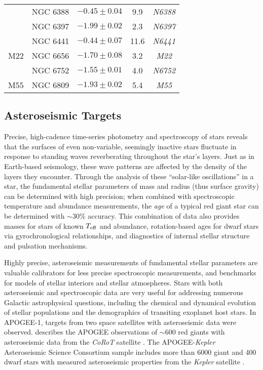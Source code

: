\documentclass[12pt,twocolumn]{emulateapj}
\begin{document}
\begin{table*}[hpbt]
\begin{center}
\begin{tabular}{l l c c c}
 & NGC 6388 & $-0.45 \pm 0.04$ & 9.9 & {\it N6388} \\
 & NGC 6397 & $-1.99 \pm 0.02$ & 2.3 & {\it N6397} \\
 & NGC 6441 & $-0.44 \pm 0.07$ & 11.6 & {\it N6441} \\
M22 & NGC 6656 & $-1.70 \pm 0.08$ & 3.2 & {\it M22} \\
 & NGC 6752 & $-1.55 \pm 0.01$ & 4.0 & {\it N6752} \\
M55 & NGC 6809 & $-1.93 \pm 0.02$ & 5.4 & {\it M55} \\
  \end{tabular}
  \label{tab:clusters}
  \end{center}
\end{table*}


\subsection{Asteroseismic Targets}
\label{sec:asteroseismic}

Precise, high-cadence time-series photometry and spectroscopy of stars reveals that the surfaces of even non-variable, seemingly inactive stars fluctuate in response to standing waves reverberating throughout the star's layers.  Just as in Earth-based seismology, these wave patterns are affected by the density of the layers they encounter.  Through the analysis of these ``solar-like oscillations'' in a star, the fundamental stellar parameters of mass and radius (thus surface gravity) can be determined with high precision; when combined with spectroscopic temperature and abundance measurements, the {\it age} of a typical red giant star can be determined with $\sim$30\% accuracy.  This combination of data also provides masses for stars of known $T_{\rm eff}$ and abundance, rotation-based ages for dwarf stars via gyrochronological relationships, and diagnostics of internal stellar structure and pulsation mechanisms.

Highly precise, asteroseismic measurements of fundamental stellar parameters are valuable calibrators for less precise spectroscopic measurements, and benchmarks for models of stellar interiors and stellar atmospheres.  Stars with both asteroseismic and spectroscopic data are very useful for addressing numerous Galactic astrophysical questions, including the chemical and dynamical evolution of stellar populations and the demographics of transiting exoplanet host stars. In APOGEE-1, targets from two space satellites with asteroseismic data were observed. \citet{Anders_2017_corotgee} describes the APOGEE observations of $\sim$600 red giants with asteroseismic data from the {\it CoRoT} satellite \citep{Baglin_2006_corot}.  The APOGEE-{\it Kepler} Asteroseismic Science Consortium sample \citep[APOKASC sample;][]{Pinsonneault_2014_apokasc} includes more than 6000 giant and 400 dwarf stars with measured asteroseismic properties from the {\it Kepler} satellite \citep{Borucki_2010_keplerintro}.  
\end{document}
